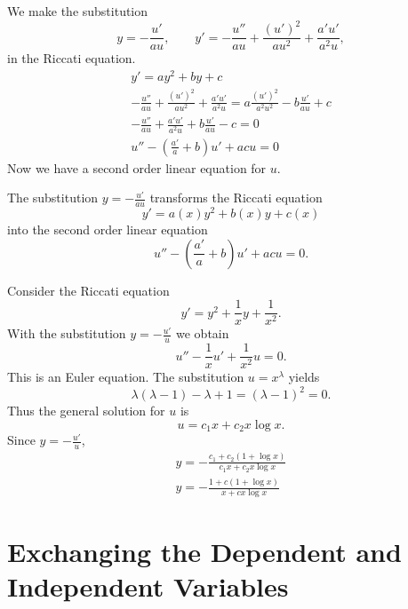 We make the substitution 
\[y = -\frac{u'}{au}, \qquad 
y' = -\frac{u''}{a u} + \frac{(u')^2}{a u^2} 
+ \frac{a' u'}{a^2 u}, \]
in the Riccati equation.
\begin{gather*}
  y' = a y^2 + b y + c \\
  -\frac{u''}{a u} + \frac{(u')^2}{a u^2} 
  + \frac{a' u'}{a^2 u}
  = a \frac{(u')^2}{a^2 u^2} - b \frac{u'}{a u}+c\\
  -\frac{u''}{a u} + \frac{a' u'}{a^2 u} + b \frac{u'}{a u}
  - c = 0 \\
  u'' - \left(\frac{a'}{a} + b\right) u'+ a c u = 0
\end{gather*}
Now we have a second order linear equation for $u$.



\begin{Result}
  The substitution $y = -\frac{u'}{a u}$ transforms the Riccati 
  equation
  \[
  y' = a(x) y^2 + b(x) y + c(x)
  \]
  into the second order linear equation
  \[
  u'' - \left(\frac{a'}{a} + b\right) u'+ a c u = 0.
  \]
\end{Result}




\begin{Example}
  Consider the Riccati equation
  \[ y' = y^2 + \frac{1}{x} y + \frac{1}{x^2}. \]
  With the substitution $y = -\frac{u'}{u}$ we obtain
  \[ u'' - \frac{1}{x} u' + \frac{1}{x^2} u = 0. \]
  This is an Euler equation.  The substitution $u = x^\lambda$ yields
  \[ \lambda(\lambda-1) - \lambda + 1 = (\lambda-1)^2 = 0. \]
  Thus the general solution for $u$ is
  \[ u = c_1 x + c_2 x \log x. \]
  Since $y = -\frac{u'}{u}$,
  \begin{gather*} 
    y = -\frac{c_1 + c_2 (1 + \log x)}{c_1 x + c_2 x \log x} \\
    \boxed{
      y = -\frac{1 + c (1 + \log x)}{x + c x \log x} 
      }
  \end{gather*}
\end{Example}









\section{Exchanging the Dependent and Independent Variables}



